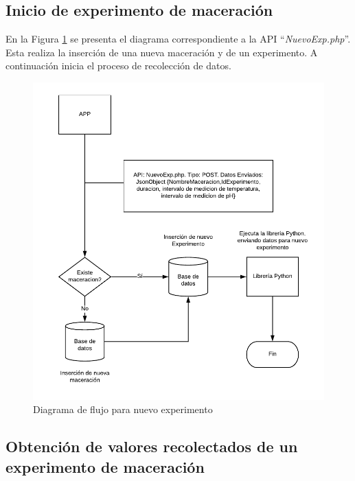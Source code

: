         \subsection{Inicio de experimento de maceración}
        \par En la Figura \ref{fig:ApiNuevoExp} se presenta el diagrama correspondiente a la API ``\textit{NuevoExp.php}''. Esta realiza la inserción de una nueva maceración y de un experimento. A continuación inicia el proceso de recolección de datos.
            \begin{figure}
                \centering
                \includegraphics[scale=0.95]{Interfaz_Hard-Soft/DiagramaNuevoExp.pdf}
                \caption{Diagrama de flujo para nuevo experimento}
                \label{fig:ApiNuevoExp}
            \end{figure}
            
        \subsection{Obtención de valores recolectados de un experimento de maceración}
        
